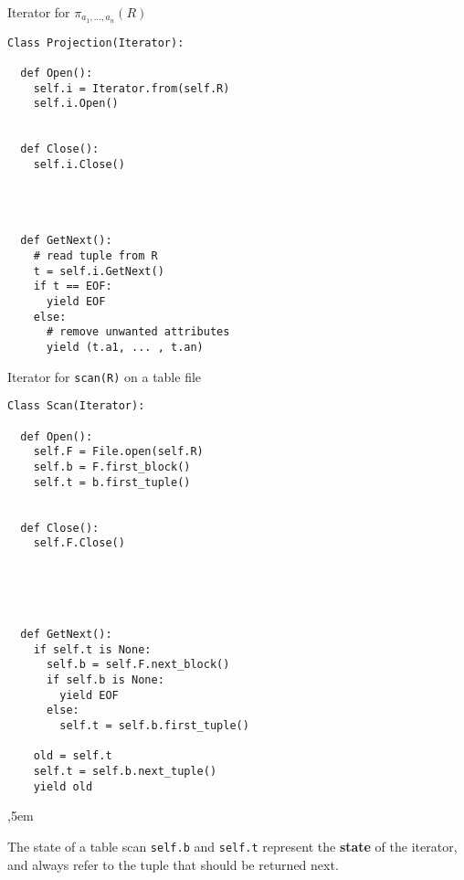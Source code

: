 %
%
\begin{frame}[fragile]{Iterator for $\pi_{a_1,\ldots,a_n}(R)$}

\begin{lstlisting}[style=Python,multicols=2]
Class Projection(Iterator):

  def Open():
    self.i = Iterator.from(self.R)
    self.i.Open()


  def Close():
    self.i.Close()




  def GetNext():
    # read tuple from R
    t = self.i.GetNext() 
    if t == EOF:
      yield EOF
    else:
      # remove unwanted attributes
      yield (t.a1, ... , t.an)

\end{lstlisting}

\end{frame}

%
%
\begin{frame}[fragile]{Iterator for \lstinline[style=SQL]{scan(R)} on a table file}
\label{table_scan_iterator}

\begin{lstlisting}[style=Python,multicols=2]
Class Scan(Iterator):

  def Open():
    self.F = File.open(self.R)
    self.b = F.first_block()
    self.t = b.first_tuple()
    

  def Close():
    self.F.Close()





  def GetNext():
    if self.t is None:
      self.b = self.F.next_block()
      if self.b is None:
        yield EOF
      else:
        self.t = self.b.first_tuple()

    old = self.t
    self.t = self.b.next_tuple()
    yield old
\end{lstlisting}


,5em

\begin{block}{The state of a table scan}
\lstinline[style=Python]{self.b} and \lstinline[style=Python]{self.t} represent the \textbf{state} of the iterator, and always refer to the tuple that should be returned next.
\end{block}

\end{frame}

%
%

